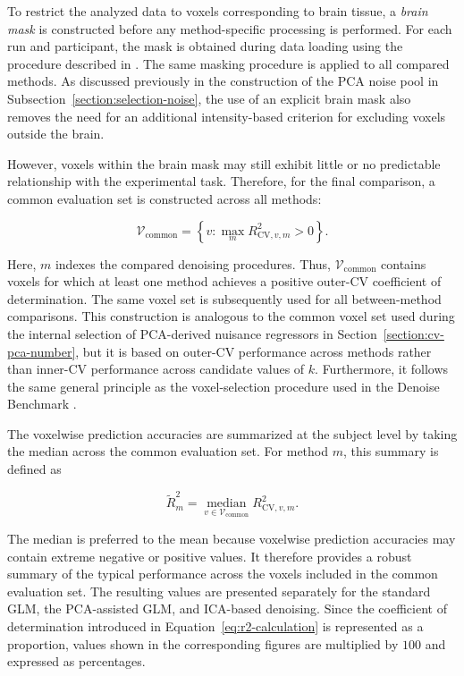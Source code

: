 \documentclass[english]{pwr_wmat_praca_dyplomowa}
\theoremstyle{definition}
\theoremstyle{remark}
\begin{document}
To restrict the analyzed data to voxels corresponding to brain tissue, a \textit{brain mask} is constructed before any method-specific processing is performed. For each run and participant, the mask is obtained during data loading using the procedure described in \cite{nilearn}. The same masking procedure is applied to all compared methods. As discussed previously in the construction of the PCA noise pool in Subsection~\ref{section:selection-noise}, the use of an explicit brain mask also removes the need for an additional intensity-based criterion for excluding voxels outside the brain.

However, voxels within the brain mask may still exhibit little or no predictable relationship with the experimental task. Therefore, for the final comparison, a common evaluation set is constructed across all methods:

\begin{equation}
    \mathcal{V}_{\mathrm{common}}
    =
    \left\{
        v :
        \max_m R^2_{\mathrm{CV},v,m} > 0
    \right\}.
    \label{eq:common-candidate-mask}
\end{equation}

Here, $m$ indexes the compared denoising procedures. Thus, $\mathcal{V}_{\mathrm{common}}$ contains voxels for which at least one method achieves a positive outer-CV coefficient of determination. The same voxel set is subsequently used for all between-method comparisons. This construction is analogous to the common voxel set used during the internal selection of PCA-derived nuisance regressors in Section~\ref{section:cv-pca-number}, but it is based on outer-CV performance across methods rather than inner-CV performance across candidate values of $k$. Furthermore, it follows the same general principle as the voxel-selection procedure used in the Denoise Benchmark \cite{glm-denoise}.

The voxelwise prediction accuracies are summarized at the subject level by taking the median across the common evaluation set. For method $m$, this summary is defined as

\begin{equation}
    \widetilde{R}^2_m
    = \operatorname*{median}_{v\in\mathcal{V}_{\mathrm{common}}} R^2_{\mathrm{CV},v,m}.
    \label{eq:median-outer-r2}
\end{equation}

The median is preferred to the mean because voxelwise prediction accuracies may contain extreme negative or positive values. It therefore provides a robust summary of the typical performance across the voxels included in the common evaluation set. The resulting values are presented separately for the standard GLM, the PCA-assisted GLM, and ICA-based denoising. Since the coefficient of determination introduced in Equation~\eqref{eq:r2-calculation}
is represented as a proportion, values shown in the corresponding figures
are multiplied by $100$ and expressed as percentages.
\end{document}

